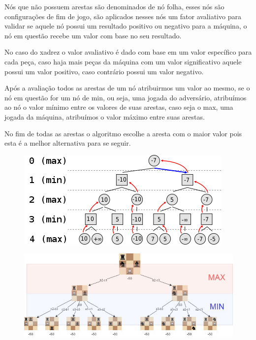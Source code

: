 Nós que não possuem arestas são denominados de nó folha, esses nós são configurações de fim de jogo, são aplicados nesses nós um fator avaliativo
para validar se aquele nó possui um resultado positivo ou negativo para a máquina, o nó em questão recebe um valor com base no seu resultado.


No caso do xadrez o valor avaliativo é dado com base em um valor específico para cada peça, caso haja mais peças da máquina com um valor
significativo aquele  possui um valor positivo, caso contrário possui um valor negativo.

Após a avaliação todos as arestas de um nó atribuirmos um valor ao mesmo, se o nó em questão for um nó de min, ou seja, uma jogada
do adversário, atribuímos ao nó o valor mínimo entre os valores de suas arestas, caso seja o max, uma jogada da máquina, atribuímos
o valor máximo entre suas arestas.

No fim de todas as arestas o algoritmo escolhe a aresta com o maior valor pois esta é a melhor alternativa para se seguir.

\begin{figure}[!ht]
    \centering
    \label{minimax}
    \includegraphics[scale=0.8]{figuras/minimax2.png}
\end{figure}

\begin{figure}[!ht]
    \centering
    \label{minimax-chess}
    \includegraphics[scale=0.5]{figuras/Minimax Chess.jpeg}
\end{figure}



